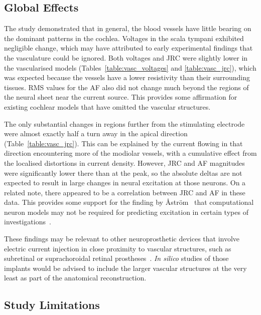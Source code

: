 \subsection{Global Effects}

The study demonstrated that in general, the blood vessels have little bearing on
the dominant patterns in the cochlea. Voltages in the scala tympani exhibited
negligible change, which may have attributed to early experimental findings that
the vasculature could be ignored. Both voltages and JRC were slightly lower in
the vascularised models (Tables~\ref{table:vasc_voltages} and
\ref{table:vasc_jrc}), which was expected because the vessels have a lower
resistivity than their surrounding tissues. RMS values for the AF also did not
change much beyond the regions of the neural sheet near the current source. This
provides some affirmation for existing cochlear models that have omitted the
vascular structures.

The only substantial changes in regions further from the stimulating electrode
were almost exactly half a turn away in the apical direction
(Table~\ref{table:vasc_jrc}). This can be explained by the current flowing in
that direction encountering more of the modiolar vessels, with a cumulative
effect from the localised distortions in current density. However, JRC and AF
magnitudes were significantly lower there than at the peak, so the absolute
deltas are not expected to result in large changes in neural excitation at those
neurons. On a related note, there appeared to be a correlation between JRC and
AF in these data. This provides some support for the finding by
{\AA}str{\"o}m~\etal{} that computational neuron models may not be required for
predicting excitation in certain types of investigations~\cite{astrom2014}.

These findings may be relevant to other neuroprosthetic devices that involve
electric current injection in close proximity to vascular structures, such as
subretinal or suprachoroidal retinal prostheses~\cite{guenther2012}. \textit{In
silico} studies of those implants would be advised to include the larger
vascular structures at the very least as part of the anatomical reconstruction.

\subsection{Study Limitations}

